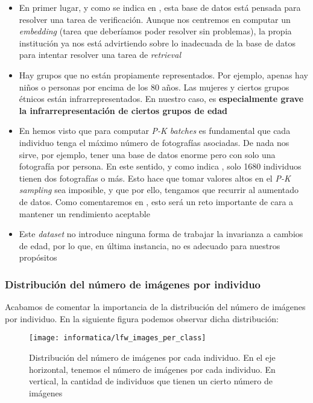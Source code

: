 \begin{itemize}
    \item En primer lugar, y como se indica en \cite{informatica:lfw_dataset}, esta base de datos está pensada para resolver una tarea de verificación. Aunque nos centremos en computar un \textit{embedding} (tarea que deberíamos poder resolver sin problemas), la propia institución ya nos está advirtiendo sobre lo inadecuada de la base de datos para intentar resolver una tarea de \textit{retrieval}
    \item Hay grupos que no están propiamente representados. Por ejemplo, apenas hay niños o personas por encima de los 80 años. Las mujeres y ciertos grupos étnicos están infrarrepresentados. En nuestro caso, es \textbf{especialmente grave la infrarrepresentación de ciertos grupos de edad}
    \item En  hemos visto que para computar \textit{P-K batches} es fundamental que cada individuo tenga el máximo número de fotografías asociadas. De nada nos sirve, por ejemplo, tener una base de datos enorme pero con solo una fotografía por persona. En este sentido, y como indica \cite{informatica:lfw_dataset}, solo 1680 individuos tienen dos fotografías o más. Esto hace que tomar valores altos en el \textit{P-K sampling} sea imposible, y que por ello, tengamos que recurrir al aumentado de datos. Como comentaremos en , esto será un reto importante de cara a mantener un rendimiento aceptable
    \item Este \textit{dataset} no introduce ninguna forma de trabajar la invarianza a cambios de edad, por lo que, en última instancia, no es adecuado para nuestros propósitos
\end{itemize}

\subsubsection{Distribución del número de imágenes por individuo} \label{isubsubs:imagenes_por_clase_lfw}

Acabamos de comentar la importancia de la distribución del número de imágenes por individuo. En la siguiente figura podemos observar dicha distribución:

\begin{figure}[H]
    \centering
    \texttt{[image: informatica/lfw\_images\_per\_class]}
    \caption{Distribución del número de imágenes por cada individuo. En el eje horizontal, tenemos el número de imágenes por cada individuo. En vertical, la cantidad de individuos que tienen un cierto número de imágenes}
\end{figure}

